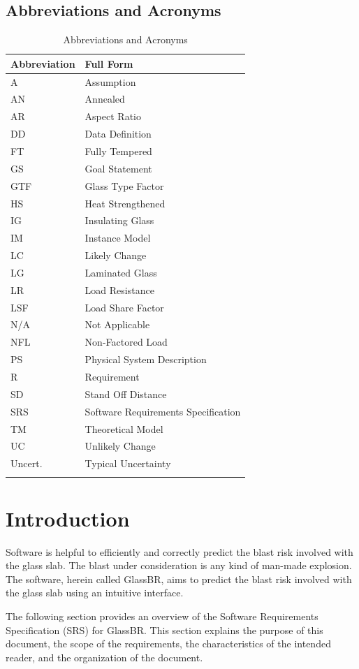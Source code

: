 \documentclass[12pt]{article}
\begin{document}
\subsection{Abbreviations and Acronyms}
\label{Sec:TAbbAcc}
\begin{longtable}{l l}
\toprule
\textbf{Abbreviation} & \textbf{Full Form}
\\
\midrule
\endhead
A & Assumption
\\
AN & Annealed
\\
AR & Aspect Ratio
\\
DD & Data Definition
\\
FT & Fully Tempered
\\
GS & Goal Statement
\\
GTF & Glass Type Factor
\\
HS & Heat Strengthened
\\
IG & Insulating Glass
\\
IM & Instance Model
\\
LC & Likely Change
\\
LG & Laminated Glass
\\
LR & Load Resistance
\\
LSF & Load Share Factor
\\
N/A & Not Applicable
\\
NFL & Non-Factored Load
\\
PS & Physical System Description
\\
R & Requirement
\\
SD & Stand Off Distance
\\
SRS & Software Requirements Specification
\\
TM & Theoretical Model
\\
UC & Unlikely Change
\\
Uncert. & Typical Uncertainty
\\
\bottomrule
\caption{Abbreviations and Acronyms}
\label{Table:TAbbAcc}
\end{longtable}
\section{Introduction}
\label{Sec:Intro}
Software is helpful to efficiently and correctly predict the blast risk involved with the glass slab. The blast under consideration is any kind of man-made explosion. The software, herein called GlassBR, aims to predict the blast risk involved with the glass slab using an intuitive interface.

The following section provides an overview of the Software Requirements Specification (SRS) for GlassBR. This section explains the purpose of this document, the scope of the requirements, the characteristics of the intended reader, and the organization of the document.
\end{document}
